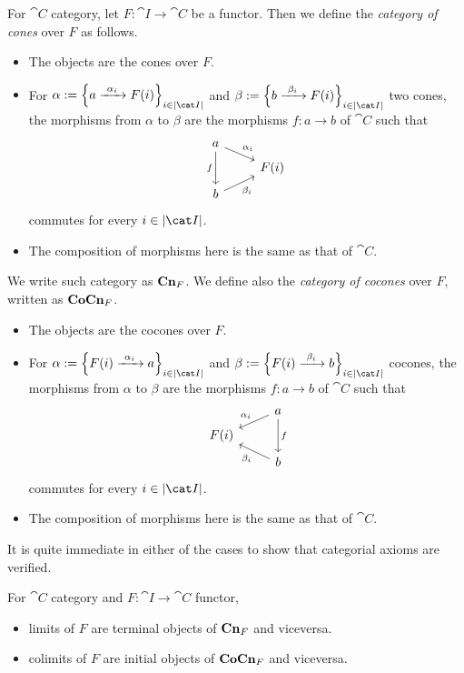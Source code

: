 \begin{construction}
For \(\cat C\) category, let \(F : \cat I \to \cat C\) be a functor. Then we define the {\em category of cones} over \(F\) as follows.
\begin{itemize}
\item The objects are the cones over \(F\).
\item For \(\alpha := \set{a \functo{\alpha_i} F(i)}_{i \in \obj{\cat I}}\) and \(\beta := \set{b \functo{\beta_i} F(i)}_{i \in \obj{\cat I}}\) two cones, the morphisms from \(\alpha\) to \(\beta\) are the morphisms \(f : a \to b\) of \(\cat C\) such that
\[\begin{tikzcd}[row sep=tiny]
a \ar["{\alpha_i}", dr] \ar["f", dd, swap] \\
& F(i) \\
b \ar["{\beta_i}", ur, swap]
\end{tikzcd}\]
commutes for every \(i \in \obj{\cat I}\).
\item The composition of morphisms here is the same as that of \(\cat C\).
\end{itemize}
We write such category as \(\mathbf{Cn}_F\). We define also the {\em category of cocones} over \(F\), written as \(\mathbf{CoCn}_F\).
\begin{itemize}
\item The objects are the cocones over \(F\).
\item For \(\alpha := \set{F(i) \functo{\alpha_i} a}_{i \in \obj{\cat I}}\) and \(\beta := \set{F(i) \functo{\beta_i} b}_{i \in \obj{\cat I}}\) cocones, the morphisms from \(\alpha\) to \(\beta\) are the morphisms \(f : a \to b\) of \(\cat C\) such that
\[\begin{tikzcd}[row sep=tiny]
& a \ar["{\alpha_i}", dl, swap] \ar["f", dd] \\
F(i) \\
& b \ar["{\beta_i}", ul]
\end{tikzcd}\]
commutes for every \(i \in \obj{\cat I}\).
\item The composition of morphisms here is the same as that of \(\cat C\).
\end{itemize}
It is quite immediate in either of the cases to show that categorial axioms are verified.
\end{construction}

\begin{proposition}
For \(\cat C\)  category and \(F : \cat I \to \cat C\) functor,
\begin{itemize}
\item limits of \(F\) are terminal objects of \(\mathbf{Cn}_F\) and viceversa.
\item colimits of \(F\) are initial objects of \(\mathbf{CoCn}_F\) and viceversa.
\end{itemize}
\end{proposition}

